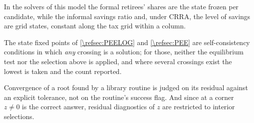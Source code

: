 In the solvers of this model the formal retirees' shares are the state frozen per candidate, while the informal savings ratio and, under CRRA, the level of savings are grid states, constant along the tax grid within a column.

The state fixed points of \cref{\refsec:PEELOG} and \cref{\refsec:PEE} are self-consistency conditions in which \emph{any} crossing is a solution; for those, neither the equilibrium test nor the selection above is applied, and where several crossings exist the lowest is taken and the count reported.

Convergence of a root found by a library routine is judged on its residual against an explicit tolerance, not on the routine's success flag. And since at a corner $z\neq 0$ is the correct answer, residual diagnostics of $z$ are restricted to interior selections.
